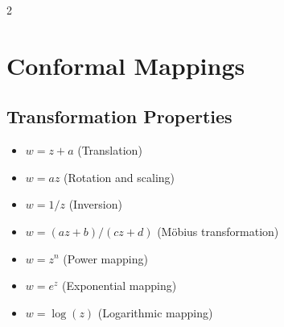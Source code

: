 \begin{multicols}{2}
\section*{Conformal Mappings} 
\subsection*{Transformation Properties}
\begin{itemize}
\item $w = z + a$ (Translation)
\item $w = az$ (Rotation and scaling)
\item $w = 1/z$ (Inversion)
\item $w = (az+b)/(cz+d)$ (Möbius transformation)
\item $w = z^n$ (Power mapping)
\item $w = e^z$ (Exponential mapping)
\item $w = \log(z)$ (Logarithmic mapping)
\end{itemize}

\end{multicols}

    